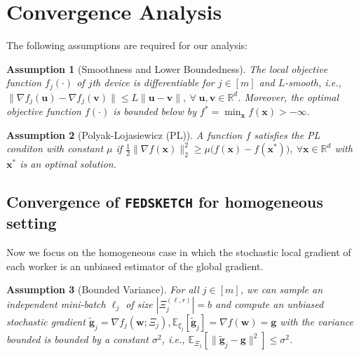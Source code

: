 \documentclass[review,onefignum,onetabnum]{siamart190516}
\newtheorem{assumption}{Assumption}
\begin{document}
\section{Convergence Analysis}\label{sec:analysis}
The following assumptions are required for our analysis:
\begin{assumption}[Smoothness and Lower Boundedness]\label{Assu:1}
The local objective function $f_j(\cdot)$ of $j$th device is differentiable for $j\in [m]$ and $L$-smooth, i.e., $\|\nabla f_j(\boldsymbol{u})-\nabla f_j(\mathbf{v})\|\leq L\|\boldsymbol{u}-\mathbf{v}\|,\: \forall \;\boldsymbol{u},\mathbf{v}\in\mathbb{R}^d$. Moreover, the optimal objective function $f(\cdot)$ is bounded below by ${f^*} = \min_{\boldsymbol{x}} f(\boldsymbol{x})>-\infty$. 
\end{assumption}
\begin{assumption}[Polyak-Lojasiewicz (PL)]\label{assum:pl}
A function $f$  satisfies the PL conditon with constant $\mu$ if $\frac{1}{2}\|\nabla f(\boldsymbol{x})\|_2^2\geq \mu\big(f(\boldsymbol{x})-f(\boldsymbol{x}^*)\big),\: \forall \boldsymbol{x}\in\mathbb{R}^d $ with $\boldsymbol{x}^*$ is an optimal solution.
\end{assumption}


\subsection{Convergence of \texttt{FEDSKETCH} for homogeneous setting}
Now we focus on the homogeneous case in which the stochastic local gradient of each worker is an unbiased estimator of the global gradient.


\begin{assumption}[Bounded Variance]\label{Assu:1.5}
For all $j\in [m]$, we can sample an independent mini-batch $\ell_j$   of size $|\Xi_j^{(\ell,r)}| = b$ and compute an unbiased stochastic gradient  $\tilde{\mathbf{g}}_j = \nabla f_j(\boldsymbol{w}; \Xi_j), \mathbb{E}_{\xi_j}[\tilde{\mathbf{g}}_j] = \nabla f(\boldsymbol{w})=\mathbf{g}$ with  the variance bounded is bounded by a constant $\sigma^2$, i.e., $
\mathbb{E}_{\Xi_j}\left[\|\tilde{\mathbf{g}}_j-\mathbf{g}\|^2\right]\leq \sigma^2$.
\end{assumption}
\end{document}
